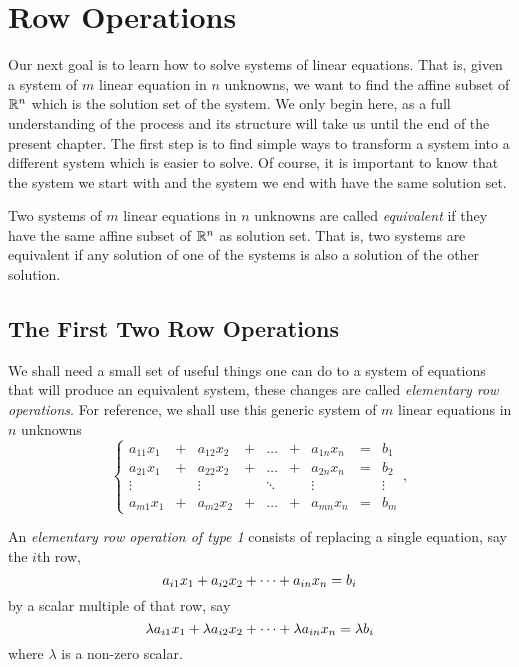 \documentclass[elementsmain.tex]{subfiles}
\begin{document}
\section{Row Operations}

Our next goal is to learn how to solve systems of linear equations. That is, given a system of $m$ linear equation in $n$ unknowns, we want to find the affine subset of $\mathbb{R}^n$ which is the solution set of the system. We only begin here, as a full understanding of the process and its structure will take us until the end of the present chapter. The first step is to find simple ways to transform a system into a different system which is easier to solve. Of course, it is important to know that the system we start with and the system we end with have the same solution set.

\begin{definition} Two systems of $m$ linear equations in $n$ unknowns are called \emph{equivalent} if they have the same affine subset of $\mathbb{R}^n$ as solution set. That is, two systems are equivalent if any solution of one of the systems is also a solution of the other solution.
\end{definition}

\subsection*{The First Two Row Operations}

We shall need a small set of useful things one can do to a system of equations that will produce an equivalent system, these changes are called \emph{elementary row operations}.
For reference, we shall use this generic system of $m$ linear equations in $n$ unknowns
\begin{equation}\label{eq:08-sys}
\left\{
\begin{array}{ccccccccc}
a_{11} x_1 & + & a_{12} x_2 & + & \dots & + & a_{1n} x_n & = & b_1 \\
a_{21} x_1 & + & a_{22} x_2 & + & \dots & + & a_{2n} x_n & = & b_2 \\
\vdots     &   & \vdots     &   & \ddots &  & \vdots     &  & \vdots \\ 
a_{m1} x_1 & + & a_{m2} x_2 & + & \dots & + & a_{mn} x_n & = & b_m 
\end{array}\right.,
\end{equation}

\begin{definition}
An \emph{elementary row operation of type 1} consists of replacing a single equation, say the $i$th row,
\[
a_{i1} x_1  +  a_{i2} x_2  +  \dots  +  a_{in} x_n  =  b_i \\
\]
by a scalar multiple of that row, say
\[
\lambda a_{i1} x_1 + \lambda a_{i2} x_2  + \dots + \lambda a_{in} x_n  =  \lambda b_i \\
\]
where $\lambda$ is a non-zero scalar.
\end{definition}
\end{document}
